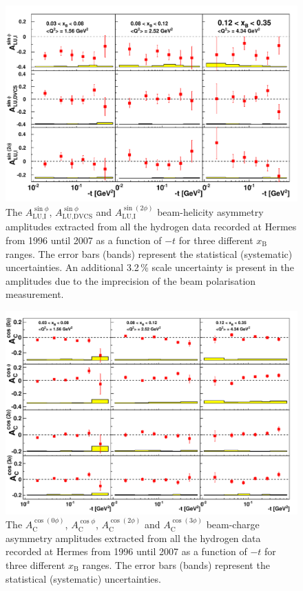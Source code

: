 \begin{figure}
 \begin{center}
 \includegraphics[width=15cm]{bsadvcsplots_tc_xbjrange_eml_par13_bin6_9607_pic_update_2}
  \caption{The $A_{\textrm{LU,I}}^{\sin\phi}$, $A_{\textrm{LU,DVCS}}^{\sin\phi}$ and
$A_{\textrm{LU,I}}^{\sin(2\phi)}$ beam-helicity asymmetry amplitudes extracted from all the hydrogen data recorded at H{\sc ermes} from 1996 until 2007 as a function of $-t$ for three different $x_{\textrm{B}}$ ranges. The error bars (bands) represent the statistical (systematic) uncertainties. An additional 3.2\,\% scale uncertainty is present in the amplitudes due to the imprecision of the beam polarisation measurement.}
  \label{bsa_xbjrange2}
 \end{center}
\end{figure}

\begin{figure}
  \begin{center}
    \includegraphics[width=15cm]{bcaplots_tc_xnjrange_eml_par13_bin6_9607_pic_cluster}
    \caption{The $A_{\textrm{C}}^{\cos(0\phi)}$, $A_{\textrm{C}}^{\cos\phi}$, $A_{\textrm{C}}^{\cos(2\phi)}$ and $A_{\textrm{C}}^{\cos(3\phi)}$ beam-charge asymmetry amplitudes extracted from all the hydrogen data recorded at H{\sc ermes} from 1996 until 2007 as a function of $-t$ for three different $x_{\textrm{B}}$ ranges. The error bars (bands) represent the statistical (systematic) uncertainties.}
  \label{bca_xbjrange2}
 \end{center}
\end{figure}


